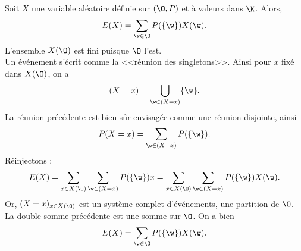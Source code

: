 \documentclass[11pt]{article}
\begin{document}
\begin{lemme}{}{}
    Soit $X$ une variable aléatoire définie sur $(\O,P)$ et à valeurs dans $\K$. Alors,
    \begin{equation*}
        E(X)=\sum_{\w\in\O}P(\{\w\})X(\w).
    \end{equation*}
    \tcblower
    L'ensemble $X(\O)$ est fini puisque $\O$ l'est.\\
    Un événement s'écrit comme la <<réunion des singletons>>. Ainsi pour $x$ fixé dans $X(\O)$, on a
    \begin{equation*}
        (X=x)=\bigcup_{\w\in(X=x)}\{\w\}.
    \end{equation*}
    La réunion précédente est bien sûr envisagée comme une réunion disjointe, ainsi
    \begin{equation*}
        P(X=x)=\sum_{\w\in(X=x)}P(\{\w\}).
    \end{equation*}
    Réinjectons :
    \begin{equation*}
        E(X)=\sum_{x\in X(\O)}\sum_{\w\in(X=x)}P(\{\w\})x=\sum_{x\in X(\O)}\sum_{\w\in(X=x)}P(\{\w\})X(\w).
    \end{equation*}
    Or, $(X=x)_{x\in X(\O)}$ est un système complet d'événements, une partition de $\O$. La double somme précédente est une somme sur $\O$. On a bien
    \begin{equation*}
        E(X)=\sum_{\w\in\O}P(\{\w\})X(\w).
    \end{equation*}
\end{lemme}
\end{document}
